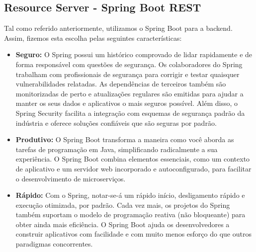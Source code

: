 \documentclass[conference]{IEEEtran}
\begin{document}
\subsection{Resource Server - Spring Boot REST}
Tal como referido anteriormente, utilizamos o Spring Boot para a backend. Assim, fizemos esta escolha pelas seguintes características:
\begin{itemize}
    \item \textbf{Seguro:} O Spring possui um histórico comprovado de lidar rapidamente e de forma responsável com questões de segurança. Os colaboradores do Spring trabalham com profissionais de segurança para corrigir e testar quaisquer vulnerabilidades relatadas. As dependências de terceiros também são monitorizadas de perto e atualizações regulares são emitidas para ajudar a manter os seus dados e aplicativos o mais seguros possível. Além disso, o Spring Security facilita a integração com esquemas de segurança padrão da indústria e oferece soluções confiáveis que são seguras por padrão. 
    \item \textbf{Produtivo:} O Spring Boot transforma a maneira como você aborda as tarefas de programação em Java, simplificando radicalmente a sua experiência. O Spring Boot combina elementos essenciais, como um contexto de aplicativo e um servidor web incorporado e autoconfigurado, para facilitar o desenvolvimento de microserviços.
    \item \textbf{Rápido:} Com o Spring, notar-se-á um rápido início, desligamento rápido e execução otimizada, por padrão. Cada vez mais, os projetos do Spring também suportam o modelo de programação reativa (não bloqueante) para obter ainda mais eficiência. O Spring Boot ajuda os desenvolvedores a construir aplicativos com facilidade e com muito menos esforço do que outros paradigmas concorrentes. 
\end{itemize}
\end{document}
